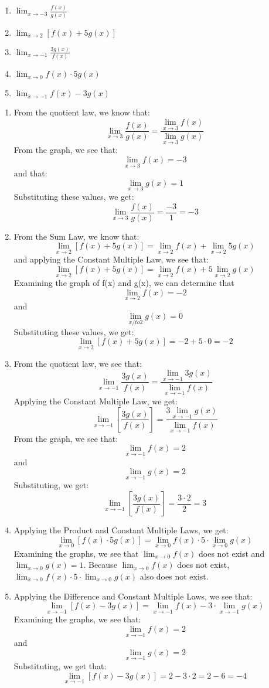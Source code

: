 \begin{Exercise}
    [title = Limits Practice 6, label=limits6]
\begin{enumerate}
    \item $\lim_{x\to-3} \frac{f(x)}{g(x)}$
    \item $\lim_{x\to2}\left[f(x) + 5g(x)\right]$
    \item $\lim_{x\to-1} \frac{3g(x)}{f(x)}$
    \item $\lim_{x\to0}f(x) \cdot 5g(x)$
    \item $\lim_{x\to-1} f(x) - 3g(x) $
\end{enumerate}
\vspace{40mm}
\end{Exercise}
\begin{Answer}
    [ref=limits6]
    \begin{enumerate}
        \item From the quotient law, we know that:$$\lim_{x\to3}\frac{f(x)}{g(x)}=\frac{\lim_{x\to3}f(x)}{\lim_{x\to3}g(x)}$$ From the graph, we see that: $$\lim_{x\to3}f(x) = -3$$ and that:$$\lim_{x\to3}g(x) = 1$$ Substituting these values, we get: $$\lim_{x\to3}\frac{f(x)}{g(x)}=\frac{-3}{1} = -3$$
        \item From the Sum Law, we know that: $$\lim_{x\to2}\left[f(x) + 5g(x)\right]=\lim_{x\to2}f(x) + \lim_{x\to2}5g(x)$$ and applying the Constant Multiple Law, we see that: $$\lim_{x\to2}\left[f(x) + 5g(x)\right]=\lim_{x\to2}f(x) + 5\lim_{x\to2}g(x)$$ Examining the graph of f(x) and g(x), we can determine that $$\lim_{x\to2}f(x) = -2$$ and $$\lim_{x/to2}g(x) = 0$$ Substituting these values, we get: $$\lim_{x\to2}\left[f(x) + 5g(x)\right]=-2 + 5 \cdot 0 = -2$$
        \item From the quotient law, we see that: $$\lim_{x\to-1} \frac{3g(x)}{f(x)}=\frac{\lim_{x\to-1}3g(x)}{\lim_{x\to-1}f(x)}$$ Applying the Constant Multiple Law, we get: $$\lim_{x\to-1} \left[\frac{3g(x)}{f(x)}\right]=\frac{3\lim_{x\to-1}g(x)}{\lim_{x\to-1}f(x)}$$ From the graph, we see that: $$\lim_{x\to-1}f(x) = 2$$ and $$\lim_{x\to-1}g(x) = 2$$ Substituting, we get: $$\lim_{x\to-1} \left[\frac{3g(x)}{f(x)}\right]=\frac{3 \cdot 2}{2}=3$$
        \item Applying the Product and Constant Multiple Laws, we get: $$\lim_{x\to0}\left[f(x) \cdot 5g(x)\right] = \lim_{x\to0}f(x) \cdot 5 \cdot \lim_{x\to0}g(x)$$ Examining the graphs, we see that $\lim_{x\to0}f(x)$ does not exist and $\lim_{x\to0}g(x) = 1$. Because $\lim_{x\to0}f(x)$ does not exist, $\lim_{x\to0}f(x) \cdot 5 \cdot \lim_{x\to0}g(x)$ also does not exist. 
        \item Applying the Difference and Constant Multiple Laws, we see that: $$\lim_{x\to-1} \left[f(x) - 3g(x)\right] =\lim_{x\to-1}f(x) - 3 \cdot \lim_{x\to-1}g(x)$$ Examining the graphs, we see that: $$\lim_{x\to-1}f(x) = 2$$ and $$\lim_{x\to-1}g(x) = 2$$ Substituting, we get that: $$\lim_{x\to-1} \left[f(x) - 3g(x)\right] =2 - 3 \cdot 2 = 2-6 = -4$$
    \end{enumerate}
\end{Answer}



